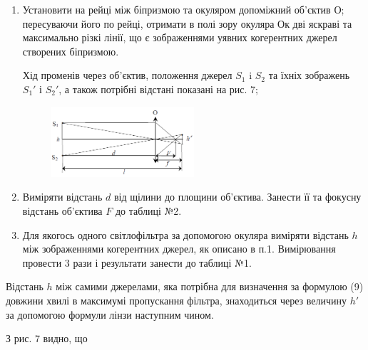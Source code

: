 \documentclass[12pt,a4paper]{article}
\begin{document}
    \begin{enumerate}

        \item Установити на рейці між біпризмою та окуляром допоміжний
        об'єктив О; пересуваючи його по рейці, отримати в полі зору окуляра Ок дві
        яскраві та максимально різкі лінії, що є зображеннями уявних когерентних
        джерел створених біпризмою.

        Хід променів через об’єктив, положення джерел $S_1$ i $S_2$ та їхніх зображень 
        $S_1'$ і $S_2'$, а також потрібні відстані показані на рис. 7;

        \begin{figure}[!ht]

            \renewcommand{\thefigure}{\arabic{figure}} %
    
            \centering
            \includegraphics[width=0.5\textwidth]{7.png}
            \caption{}
            \label{fig7:schema}
    
        \end{figure}

        \item Виміряти відстань $d$ від щілини до площини об'єктива.
        Занести її та фокусну відстань об'єктива $F$ до таблиці №2.

        \item Для якогось одного світлофільтра за допомогою окуляра виміряти відстань
        $h$ між зображеннями когерентних джерел, як описано в п.1. 
        Вимірювання провести 3 рази і результати занести до таблиці №1.

    \end{enumerate}

    Відстань $h$ між самими джерелами, яка потрібна для визначення за формулою (9)
    довжини хвилі в максимумі пропускання фільтра, знаходиться через величину
    $h'$ за допомогою формули лінзи наступним чином.

    З рис. 7 видно, що
\end{document}
